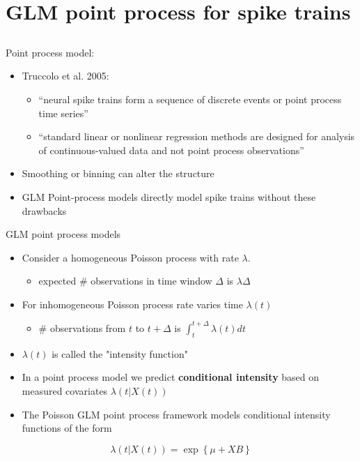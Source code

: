 \documentclass[svgnames,13pt]{beamer}
\DeclareRobustCommand{\emph}[1]{\textbf{{\color{emphasizecolor} #1}}}
\begin{document}
\section{GLM point process for spike trains}


\subsection{ }

\begin{frame}{Point process model:}
\begin{itemize}
	\item Truccolo et al. 2005:
	\begin{itemize}
		\item <1->``neural spike trains form a sequence of discrete events or point process time series''
		\item <2->``standard linear or nonlinear regression methods are designed for analysis of continuous-valued data and not point process observations''
		\end{itemize}
	\item <3->Smoothing or binning can alter the structure
	\item <4->GLM Point-process models directly model spike trains without these drawbacks
\end{itemize}
\end{frame} 

\begin{frame}{GLM point process models}
\begin{itemize}
	\item <1->Consider a homogeneous Poisson process with rate $\lambda$. 
	\begin{itemize}
		\item expected \# observations in time window $\Delta$ is $\lambda\Delta$
		\end{itemize}
	\item <2->For inhomogeneous Poisson process rate varies time $\lambda(t)$
	\begin{itemize}
		\item \# observations from $t$ to $t+\Delta$ is $\int_t^{t+\Delta} \lambda(t) dt$
		\end{itemize}
	\item <3->$\lambda(t)$ is called the "intensity function"
	\item <4->In a point process model we predict \emph{conditional intensity} based on measured covariates $\lambda(t|X(t))$
	\item <5->The Poisson GLM point process framework models conditional intensity functions of the form
	\end{itemize}
\begin{overprint}
	\[\lambda(t|X(t)) = \exp \left\{ \mu + X B \right\}\]
\end{overprint}
\end{frame} 
\end{document}
